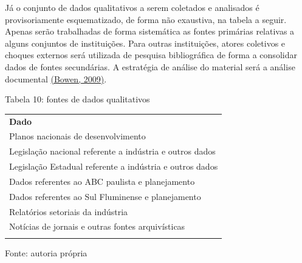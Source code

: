 Já o conjunto de dados qualitativos a serem coletados e analisados é
provisoriamente esquematizado, de forma não exaustiva, na tabela a
seguir. Apenas serão trabalhadas de forma sistemática as fontes
primárias relativas a alguns conjuntos de instituições. Para outras
instituições, atores coletivos e choques externos será utilizada de
pesquisa bibliográfica de forma a consolidar dados de fontes
secundárias. A estratégia de análise do material será a análise
documental \href{https://www.zotero.org/google-docs/?aEOaW2}{(Bowen,
2009)}.

Tabela 10: fontes de dados qualitativos

\begin{longtable}[]{@{}
  >{\raggedright\arraybackslash}p{}@{}}
\toprule\noalign{}
\begin{minipage}[b]{\linewidth}\raggedright
\textbf{Dado}
\end{minipage} \\
\begin{minipage}[b]{\linewidth}\raggedright
Planos nacionais de desenvolvimento
\end{minipage} \\
\begin{minipage}[b]{\linewidth}\raggedright
Legislação nacional referente a indústria e outros dados
\end{minipage} \\
\begin{minipage}[b]{\linewidth}\raggedright
Legislação Estadual referente a indústria e outros dados
\end{minipage} \\
\begin{minipage}[b]{\linewidth}\raggedright
Dados referentes ao ABC paulista e planejamento
\end{minipage} \\
\begin{minipage}[b]{\linewidth}\raggedright
Dados referentes ao Sul Fluminense e planejamento
\end{minipage} \\
\begin{minipage}[b]{\linewidth}\raggedright
Relatórios setoriais da indústria
\end{minipage} \\
\begin{minipage}[b]{\linewidth}\raggedright
Notícias de jornais e outras fontes arquivísticas
\end{minipage} \\
\midrule\noalign{}
\endhead
\bottomrule\noalign{}
\endlastfoot
\end{longtable}

Fonte: autoria própria

